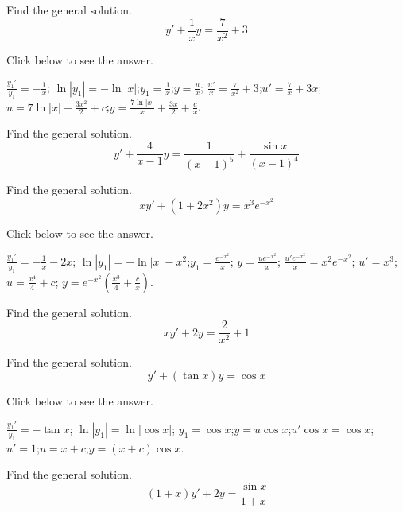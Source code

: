 \documentclass{ximera}
\begin{document}
\begin{problem}\label{exer:2.1.16} Find the general solution.
$$y'+\frac{1}{x}y=\frac{7}{x^2}+3$$

Click below to see the answer.

\begin{expandable}
    $\frac{y_1'}{ y_1}=-\frac{1}{ x}$;\quad
$\ln|y_1|=-\ln|x|$;\quad $y_1=\frac{1}{ x}$;\quad $y=\frac{u}{
x}$;\quad
$\frac{u'}{ x}=\frac{7}{ x^2}+3$;\quad $u'=\frac{7}{
x}+3x$;\quad
$u=7\ln|x|+\frac{3x^2}{2}+c$;\quad $y=\frac{7\ln|x|}{
x}+\frac{3x}{2}+\frac{c}{ x}$.
\end{expandable}
\end{problem}


\begin{problem}\label{exer:2.1.17} Find the general solution.
$$y'+\frac{4}{x-1}y= \frac{1}{(x-1)^5}+\frac{\sin x}{(x-1)^4}$$
\end{problem}

\begin{problem}\label{exer:2.1.18} Find the general solution.
$$xy'+(1+2x^2)y=x^3e^{-x^2}$$

Click below to see the answer.

\begin{expandable}
    $\frac{y_1'}{ y_1}=-\frac{1}{ x}-2x$; \quad
$\ln|y_1|=-\ln|x|-x^2$;\quad $y_1=\frac{e^{-x^2}}{ x}$;\quad
$y=\frac{ue^{-x^2}}{ x}$;\quad
$\frac{u'e^{-x^2}}{ x}=x^2e^{-x^2}$;\quad
 $u'=x^3$;\quad
$u=\frac{x^4}{4}+c$;\quad
$y=e^{-x^2}{\left(\frac{x^3}{4}+\frac{c}{ x}\right)}$.
\end{expandable}
\end{problem}

\begin{problem}\label{exer:2.1.19} Find the general solution.
$$xy'+2y=\frac{2}{x^2}+1$$
\end{problem}

\begin{problem}\label{exer:2.1.20} Find the general solution.
$$y'+(\tan x)y=\cos x$$

Click below to see the answer.

\begin{expandable}
    $\frac{y_1'}{ y_1}=-\tan x$;\quad
$\ln|y_1|=\ln|\cos x|$;\quad
$y_1=\cos x$;\quad $y=u\cos x$;\quad $u'\cos x=\cos x$;\quad
$u'=1$;\quad $u=x+c$;\quad $y=(x+c)\cos x$.
\end{expandable}
\end{problem}

\begin{problem}\label{exer:2.1.21} Find the general solution.
$$(1+x)y'+2y=\frac{\sin x}{1 + x}$$
\end{problem}
\end{document}
